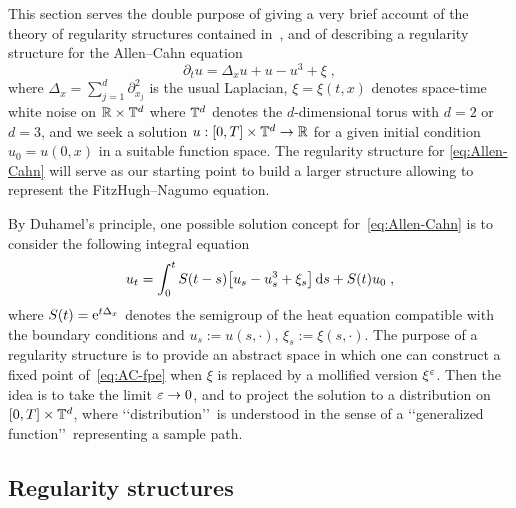 \documentclass[reqno,11pt]{article}
\begin{document}
This section serves the double purpose of giving a very brief account of the
theory of regularity structures contained in~\cite{Hairer2014}, and of
describing a regularity structure for the Allen--Cahn equation
\begin{equation}
 \label{eq:Allen-Cahn}
 \partial_t u = \Delta_x u + u - u^3 + \xi\;,
\end{equation} 
where $\Delta_x=\sum_{j=1}^d \partial_{x_j}^2$ is the usual Laplacian,
$\xi=\xi(t,x)$ denotes space-time white noise on $\mathbb{R}\times\mathbb{T}^d$ where $\mathbb{T}^d$
denotes the $d$-dimensional torus with $d=2$ or $d=3$, and we seek a
solution $u:[0,T]\times\mathbb{T}^d\to\mathbb{R}$ for a given initial condition $u_0=u(0,x)$ in
a suitable function space. The regularity structure for \eqref{eq:Allen-Cahn}
will serve as our starting point to build a larger structure allowing to
represent the FitzHugh--Nagumo equation.

By Duhamel's principle, one possible solution concept for~\eqref{eq:Allen-Cahn}
is to consider the following integral equation
\begin{equation}
 \label{eq:AC-fpe}
 u_t = \int_0^t S(t-s) \bigbrak{u_s - u_s^3 + \xi_s}\6s + S(t)u_0\;,
\end{equation} 
where $S(t)=\operatorname{e}^{t\Delta_x}$ denotes the semigroup of the heat equation
compatible with the boundary conditions and $u_s:=u(s,\cdot)$,
$\xi_s:=\xi(s,\cdot)$. The purpose of a regularity structure is to provide an
abstract space in which one can construct a fixed point of~\eqref{eq:AC-fpe}
when $\xi$ is replaced by a mollified version $\xi^\varepsilon$. Then the idea is to
take the limit $\varepsilon\to0$, and to project the solution to a distribution on
$[0,T]\times\mathbb{T}^d$, where \lq\lq distribution\rq\rq\ is understood in the sense
of a \lq\lq generalized function\rq\rq\ representing a sample path.


\subsection{Regularity structures}
\label{ssec_rs}
\end{document}
